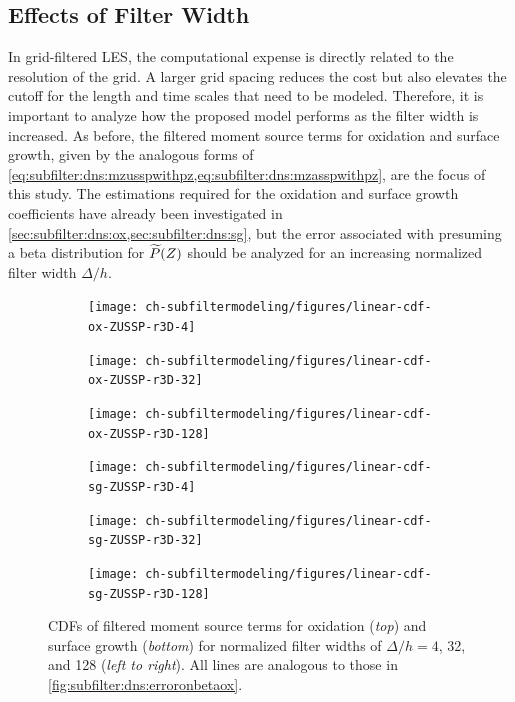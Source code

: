 \subsection{Effects of Filter Width}
\label{sec:subfilter:dns:fw}

In grid-filtered LES, the computational expense is directly related to the resolution of the grid. A larger grid spacing reduces the cost but also elevates the cutoff for the length and time scales that need to be modeled. Therefore, it is important to analyze how the proposed model performs as the filter width is increased. As before, the filtered moment source terms for oxidation and surface growth, given by the analogous forms of \cref{eq:subfilter:dns:mzusspwithpz,eq:subfilter:dns:mzasspwithpz}, are the focus of this study. The estimations required for the oxidation and surface growth coefficients have already been investigated in \cref{sec:subfilter:dns:ox,sec:subfilter:dns:sg}, but the error associated with presuming a beta distribution for $\widetilde{P}(Z)$ should be analyzed for an increasing normalized filter width $\Delta/h$. 

\begin{figure}[ht]
  \centering
  \begin{subfigure}[b]{0.33\linewidth}
    \centering
    \texttt{[image: ch-subfiltermodeling/figures/linear-cdf-ox-ZUSSP-r3D-4]}
  \end{subfigure}%
  \begin{subfigure}[b]{0.33\linewidth}
    \centering
    \texttt{[image: ch-subfiltermodeling/figures/linear-cdf-ox-ZUSSP-r3D-32]}
  \end{subfigure}%
  \begin{subfigure}[b]{0.33\linewidth}
    \centering
    \texttt{[image: ch-subfiltermodeling/figures/linear-cdf-ox-ZUSSP-r3D-128]}
  \end{subfigure}
  \begin{subfigure}[b]{0.33\linewidth}
    \centering
    \texttt{[image: ch-subfiltermodeling/figures/linear-cdf-sg-ZUSSP-r3D-4]}
  \end{subfigure}%
  \begin{subfigure}[b]{0.33\linewidth}
    \centering
    \texttt{[image: ch-subfiltermodeling/figures/linear-cdf-sg-ZUSSP-r3D-32]}
  \end{subfigure}%
  \begin{subfigure}[b]{0.33\linewidth}
    \centering
    \texttt{[image: ch-subfiltermodeling/figures/linear-cdf-sg-ZUSSP-r3D-128]}
  \end{subfigure}
  \caption[Error Associated with \texorpdfstring{$\pz = \beta(Z;\tf{Z},\tf{Z_V})$}{P(Z) = B(Z;Z,ZV)} for Various \texorpdfstring{$\Delta/h$}{D/h}]{CDFs of filtered moment source terms for oxidation (\textit{top}) and surface growth (\textit{bottom}) for normalized filter widths of $\Delta/h = 4$, 32, and 128 (\textit{left to right}). All lines are analogous to those in \cref{fig:subfilter:dns:erroronbetaox}.}
  \label{fig:subfilter:dns:erroronbetafwidth}
\end{figure}

